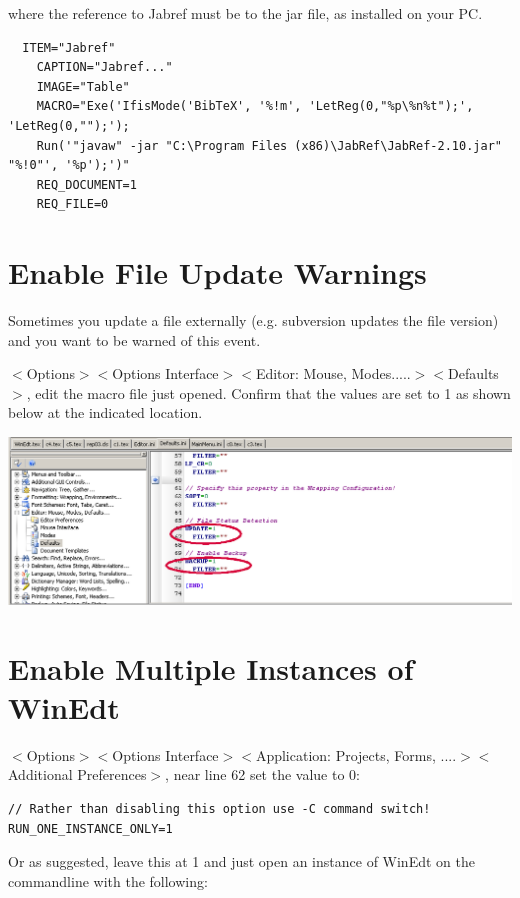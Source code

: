 where the reference to Jabref must be to the jar file, as installed on your PC.

{\footnotesize
\begin{verbatim}
  ITEM="Jabref"
    CAPTION="Jabref..."
    IMAGE="Table"
    MACRO="Exe('IfisMode('BibTeX', '%!m', 'LetReg(0,"%p\%n%t");', 'LetReg(0,"");');
    Run('"javaw" -jar "C:\Program Files (x86)\JabRef\JabRef-2.10.jar" "%!0"', '%p');')"
    REQ_DOCUMENT=1
    REQ_FILE=0
\end{verbatim}
}


\section{Enable File Update Warnings}

Sometimes you update a file externally (e.g. subversion updates the file version) and you want to be warned of this event.

$<$Options$>$$<$Options Interface$>$$<$Editor: Mouse, Modes.....$>$$<$Defaults$>$, edit the macro file just opened. Confirm that the values are set to 1 as  shown below at the indicated location.

\centerline{\includegraphics[bb= 0 0 1055 352,width=\textwidth]{eps/updatedrives.png}}




\section{Enable Multiple Instances of WinEdt}



$<$Options$>$$<$Options Interface$>$$<$Application: Projects, Forms, ....$>$$<$Additional Preferences$>$, near line 62 set the value to 0:

\begin{lstlisting}
// Rather than disabling this option use -C command switch!
RUN_ONE_INSTANCE_ONLY=1
\end{lstlisting}

Or as suggested, leave this at 1 and just open an instance of WinEdt on the commandline with the following:


